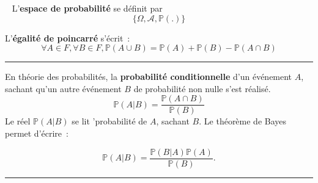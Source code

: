 \begin{f}[Axiomatique]{\ }
	L'\textbf{espace de probabilité} se définit par 
	\[ \lbrace \Omega, \mathcal{A}, \mathbb{P}(.) \rbrace \]
	
	L'\textbf{égalité de poincarré} s'écrit~:
	\[\forall A \in F, \forall B \in F, \mathbb{P} (A \cup B) = \mathbb{P} (A) + \mathbb{P} (B) - \mathbb{P} (A \cap B)\]
	
\end{f}
\hrule

\begin{f}[Bayes]
	En théorie des probabilités, la \textbf{probabilité conditionnelle} d'un événement \(A\), sachant qu'un autre événement \(B\) de probabilité non nulle s'est réalisé.
	\[
	\mathbb{P}(A|B) = \frac{\mathbb{P}(A \cap B)}{\mathbb{P}(B)}
	\]
	Le réel \(\mathbb{P}(A|B)\) se lit 'probabilité de \(A\), sachant \(B\).
	Le théorème de Bayes permet d'écrire~:
	
	\[   \mathbb{P}(A|B) = \frac{\mathbb{P}(B|A)\mathbb{P}(A)}{\mathbb{P}(B)}. \]
\end{f}
\hrule

